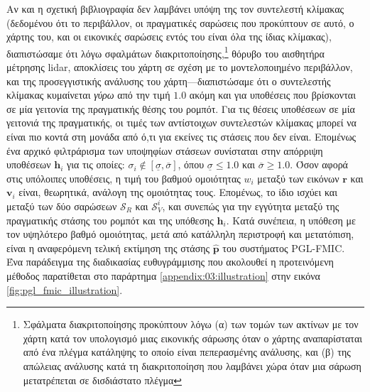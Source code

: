 Αν και η σχετική βιβλιογραφία δεν λαμβάνει υπόψη της τον συντελεστή κλίμακας
(δεδομένου ότι το περιβάλλον, οι πραγματικές σαρώσεις που προκύπτουν σε αυτό, ο
χάρτης του, και οι εικονικές σαρώσεις εντός του είναι όλα της ίδιας κλίμακας),
διαπιστώσαμε ότι λόγω σφαλμάτων διακριτοποίησης,\footnote{Σφάλματα
διακριτοποίησης προκύπτουν λόγω (α) των τομών των ακτίνων με τον χάρτη κατά τον
υπολογισμό μιας εικονικής σάρωσης όταν ο χάρτης αναπαρίσταται από ένα πλέγμα
κατάληψης το οποίο είναι πεπερασμένης ανάλυσης, και (β) της απώλειας ανάλυσης
κατά τη διακριτοποίηση που λαμβάνει χώρα όταν μια σάρωση μετατρέπεται σε
δισδιάστατο πλέγμα} θόρυβο του αισθητήρα μέτρησης lidar, αποκλίσεις του χάρτη
σε σχέση με το μοντελοποιημένο περιβάλλον, και της προσεγγιστικής ανάλυσης του
χάρτη---διαπιστώσαμε ότι ο συντελεστής κλίμακας κυμαίνεται \textit{γύρω} από
την τιμή $1.0$ ακόμη και για υποθέσεις που βρίσκονται σε μία γειτονία της
πραγματικής θέσης του ρομπότ. Για τις θέσεις υποθέσεων σε μία γειτονιά της
πραγματικής, οι τιμές των αντίστοιχων συντελεστών κλίμακας μπορεί να είναι πιο
κοντά στη μονάδα από ό,τι για εκείνες τις στάσεις που δεν είναι. Επομένως ένα
αρχικό φιλτράρισμα των υποψηφίων στάσεων συνίσταται στην απόρριψη υποθέσεων
$\bm{h}_i$ για τις οποίες: $\sigma_i \not\in [\underline{\sigma},
\overline{\sigma}]$, όπου $\underline{\sigma} \leq 1.0$ και $\overline{\sigma}
\geq 1.0$. Όσον αφορά στις υπόλοιπες υποθέσεις, η τιμή του βαθμού ομοιότητας
$w_i$ μεταξύ των εικόνων $\bm{r}$ και $\bm{v}_i$ είναι, θεωρητικά, ανάλογη της
ομοιότητας τους.  Επομένως, το ίδιο ισχύει και μεταξύ των δύο σαρώσεων
$\mathcal{S}_R$ και $\mathcal{S}_V^i$, και συνεπώς για την εγγύτητα μεταξύ της
πραγματικής στάσης του ρομπότ και της υπόθεσης $\bm{h}_i$.  Κατά συνέπεια, η
υπόθεση με τον υψηλότερο βαθμό ομοιότητας, μετά από κατάλληλη περιστροφή και
μετατόπιση, είναι η αναφερόμενη τελική εκτίμηση της στάσης $\bm{\hat{p}}$ του
συστήματος PGL-FMIC. Ένα παράδειγμα της διαδικασίας ευθυγράμμισης που ακολουθεί
η προτεινόμενη μέθοδος παρατίθεται στο παράρτημα \ref{appendix:03:illustration}
στην εικόνα \ref{fig:pgl_fmic_illustration}.
